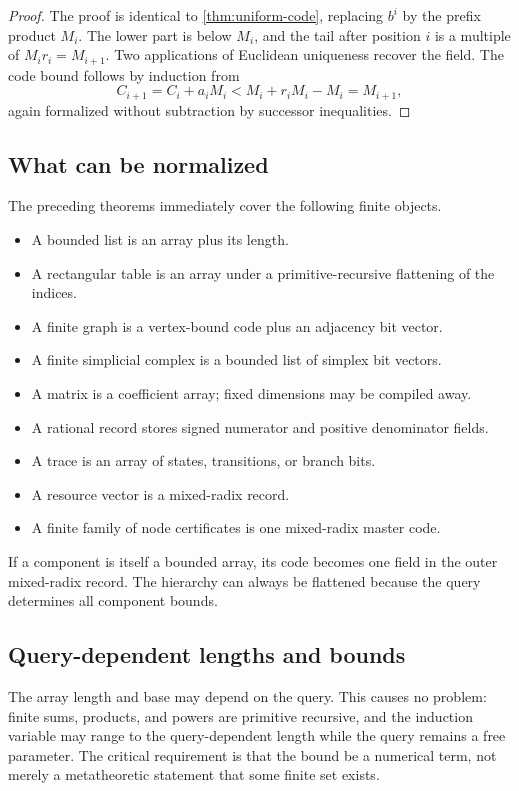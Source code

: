 \begin{proof}
The proof is identical to \cref{thm:uniform-code}, replacing \(b^i\) by the
prefix product \(M_i\).  The lower part is below \(M_i\), and the tail after
position \(i\) is a multiple of \(M_ir_i=M_{i+1}\).  Two applications of
Euclidean uniqueness recover the field.  The code bound follows by induction
from
\[
  C_{i+1}=C_i+a_iM_i<M_i+r_iM_i-M_i=M_{i+1},
\]
again formalized without subtraction by successor inequalities.
\end{proof}

\subsection{What can be normalized}

The preceding theorems immediately cover the following finite objects.

\begin{itemize}
\item A bounded list is an array plus its length.
\item A rectangular table is an array under a primitive-recursive flattening
of the indices.
\item A finite graph is a vertex-bound code plus an adjacency bit vector.
\item A finite simplicial complex is a bounded list of simplex bit vectors.
\item A matrix is a coefficient array; fixed dimensions may be compiled away.
\item A rational record stores signed numerator and positive denominator
fields.
\item A trace is an array of states, transitions, or branch bits.
\item A resource vector is a mixed-radix record.
\item A finite family of node certificates is one mixed-radix master code.
\end{itemize}

If a component is itself a bounded array, its code becomes one field in the
outer mixed-radix record.  The hierarchy can always be flattened because the
query determines all component bounds.

\subsection{Query-dependent lengths and bounds}

The array length and base may depend on the query.  This causes no problem:
finite sums, products, and powers are primitive recursive, and the induction
variable may range to the query-dependent length while the query remains a
free parameter.  The critical requirement is that the bound be a numerical
term, not merely a metatheoretic statement that some finite set exists.

